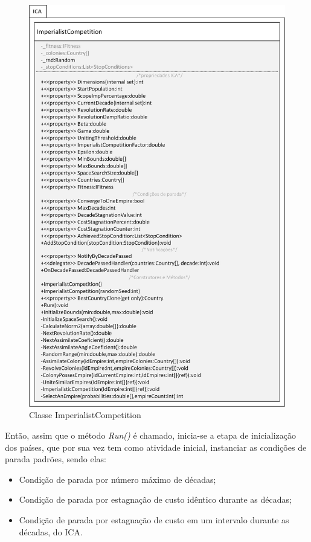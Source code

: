  \begin{figure}[h]
	\centering	
	\includegraphics[scale=0.8]{Figuras/ClassesICA-ImperialistCompetition.png}
	\caption{Classe ImperialistCompetition}
	\label{fig:ClassesICA-ImperialistCompetition}
	\end{figure}
    
Então, assim que o método \emph{Run()} é chamado, inicia-se a etapa de inicialização dos países, que por sua vez tem como atividade inicial, instanciar as condições de parada padrões, sendo elas:

\begin{itemize}
\item Condição de parada por número máximo de décadas; 
\item Condição de parada por estagnação de custo idêntico durante as décadas; 
\item Condição de parada por estagnação de custo em um intervalo durante as décadas, do ICA. 
\end{itemize}

